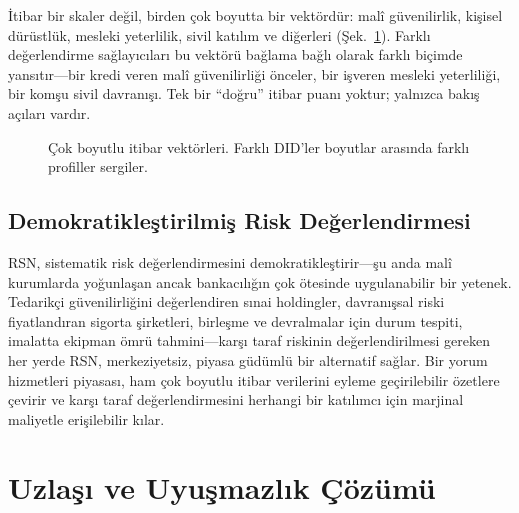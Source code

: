 \documentclass[11pt,a4paper,twocolumn]{article}
\begin{document}
İtibar bir skaler değil, birden çok boyutta bir vektördür: malî güvenilirlik, kişisel dürüstlük, mesleki yeterlilik, sivil katılım ve diğerleri (Şek.~\ref{fig:reputation-radar}). Farklı değerlendirme sağlayıcıları bu vektörü bağlama bağlı olarak farklı biçimde yansıtır---bir kredi veren malî güvenilirliği önceler, bir işveren mesleki yeterliliği, bir komşu sivil davranışı. Tek bir ``doğru'' itibar puanı yoktur; yalnızca bakış açıları vardır.

\begin{figure}[ht]
\centering
{}
\caption{Çok boyutlu itibar vektörleri. Farklı DID'ler boyutlar arasında farklı profiller sergiler.}
\label{fig:reputation-radar}
\end{figure}

\subsection{Demokratikleştirilmiş Risk Değerlendirmesi}

RSN, sistematik risk değerlendirmesini demokratikleştirir---şu anda malî kurumlarda yoğunlaşan ancak bankacılığın çok ötesinde uygulanabilir bir yetenek. Tedarikçi güvenilirliğini değerlendiren sınai holdingler, davranışsal riski fiyatlandıran sigorta şirketleri, birleşme ve devralmalar için durum tespiti, imalatta ekipman ömrü tahmini---karşı taraf riskinin değerlendirilmesi gereken her yerde RSN, merkeziyetsiz, piyasa güdümlü bir alternatif sağlar. Bir yorum hizmetleri piyasası, ham çok boyutlu itibar verilerini eyleme geçirilebilir özetlere çevirir ve karşı taraf değerlendirmesini herhangi bir katılımcı için marjinal maliyetle erişilebilir kılar.

\section{Uzlaşı ve Uyuşmazlık Çözümü}
\end{document}
